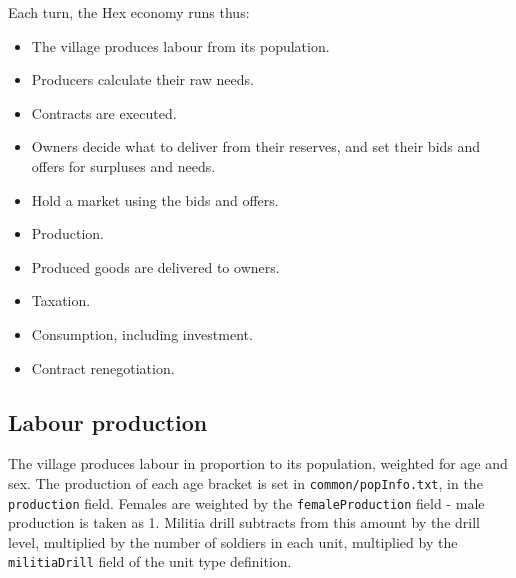 \documentclass[12pt,ebook,oneside]{book}
\begin{document}
Each turn, the Hex economy runs thus:
\begin{itemize}
\item The village produces labour from its population.
\item Producers calculate their raw needs.
\item Contracts are executed.
\item Owners decide what to deliver from their reserves,
and set their bids and offers for surpluses and needs.
\item Hold a market using the bids and offers.
\item Production.
\item Produced goods are delivered to owners.
\item Taxation.
\item Consumption, including investment.
\item Contract renegotiation.
\end{itemize}

\subsection{Labour production}

The village produces labour in proportion to its population, weighted
for age and sex. The production of each age bracket is set in
\texttt{common/popInfo.txt}, in the \texttt{production} field. Females
are weighted by the \texttt{femaleProduction} field - male production
is taken as 1. Militia drill subtracts from this amount by the drill
level, multiplied by the number of soldiers in each unit, multiplied
by the \texttt{militiaDrill} field of the unit type definition. 
\end{document}
